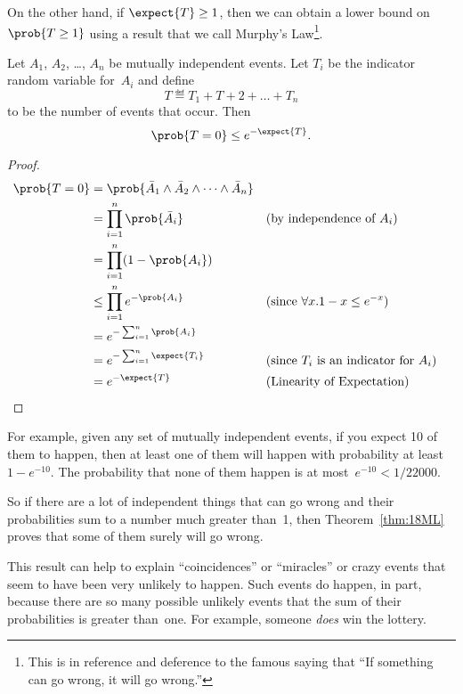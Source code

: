 On the other hand, if $\expect{T} \ge 1$, then we can obtain a lower
bound on~$\prob{T \ge 1}$ using a result that we call Murphy's
Law\footnote{This is in reference and deference to the famous saying
  that ``If something can go wrong, it will go wrong.''}.

\begin{theorem}\label{thm:18ML}
Let $A_1$, $A_2$, \dots, $A_n$ be mutually independent events.  Let
$T_i$ be the indicator random variable for~$A_i$ and define
\begin{equation*}
    T \eqdef T_1 + T+2 + \dots + T_n
\end{equation*}
to be the number of events that occur.  Then
\begin{equation*}
    \prob{T = 0} \le e^{- \expect{T}}.
\end{equation*}
\end{theorem}

\begin{proof}
\begin{align*}
\prob{T = 0}
    &= \prob{ \bar{A}_1 \land \bar{A}_2 \land \dots \land \bar{A}_n } \\
    &= \prod_{i = 1}^n \prob{\bar{A}_i}
        && \text{(by independence of $A_i$)} \\
    &= \prod_{i = 1}^n (1 - \prob{A_i}) \\
    &\le \prod_{i = 1}^n e^{-\prob{A_i}}
        && \text{(since $\forall x. 1 - x \le e^{-x}$)} \\
    &= e^{-\sum_{i = 1}^n \prob{A_i}} \\
    &= e^{-\sum_{i = 1}^n \expect{T_i}} 
        && \text{(since $T_i$ is an indicator for $A_i$)} \\
    &= e^{-\expect{T}}
        && \text{(Linearity of Expectation)}
        & \qedhere
\end{align*}
\end{proof}

For example, given any set of mutually independent events, if you
expect 10 of them to happen, then at least one of them will happen
with probability at least~$1 - e^{-10}$.  The probability that none of
them happen is at most~$e^{-10} < 1/22000$.

So if there are a lot of independent things that can go wrong and their
probabilities sum to a number much greater than~1, then
Theorem~\ref{thm:18ML} proves that some of them surely will go wrong.

This result can help to explain ``coincidences'' or ``miracles'' or
crazy events that seem to have been very unlikely to happen.  Such
events do happen, in part, because there are so many possible unlikely
events that the sum of their probabilities is greater than~one.  For
example, someone \emph{does} win the lottery.

